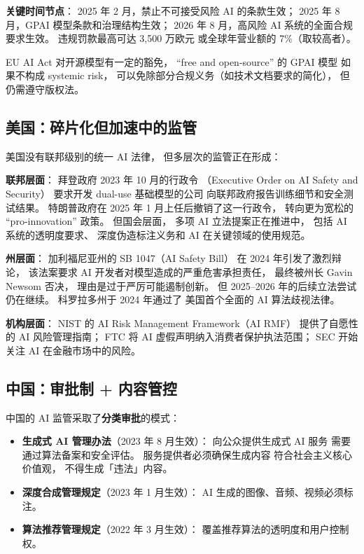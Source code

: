 \textbf{关键时间节点}：
2025 年 2 月，禁止不可接受风险 AI 的条款生效；
2025 年 8 月，GPAI 模型条款和治理结构生效；
2026 年 8 月，高风险 AI 系统的全面合规要求生效。
违规罚款最高可达 3,500 万欧元
或全球年营业额的 7\%（取较高者）。

EU AI Act 对开源模型有一定的豁免，
“free and open-source” 的 GPAI 模型
如果不构成 systemic risk，
可以免除部分合规义务（如技术文档要求的简化），
但仍需遵守版权法。

\subsection{美国：碎片化但加速中的监管}

美国没有联邦级别的统一 AI 法律，
但多层次的监管正在形成：

\textbf{联邦层面}：
拜登政府 2023 年 10 月的行政令
（Executive Order on AI Safety and Security）
要求开发 dual-use 基础模型的公司
向联邦政府报告训练细节和安全测试结果。
特朗普政府在 2025 年 1 月上任后撤销了这一行政令，
转向更为宽松的 “pro-innovation” 政策。
但国会层面，
多项 AI 立法提案正在推进中，
包括 AI 系统的透明度要求、
深度伪造标注义务和 AI 在关键领域的使用规范。

\textbf{州层面}：
加利福尼亚州的 SB 1047（AI Safety Bill）
在 2024 年引发了激烈辩论，
该法案要求 AI 开发者对模型造成的严重危害承担责任，
最终被州长 Gavin Newsom 否决，
理由是过于严厉可能遏制创新。
但 2025--2026 年的后续立法尝试仍在继续。
科罗拉多州于 2024 年通过了
美国首个全面的 AI 算法歧视法律。

\textbf{机构层面}：
NIST 的 AI Risk Management Framework（AI RMF）
提供了自愿性的 AI 风险管理指南；
FTC 将 AI 虚假声明纳入消费者保护执法范围；
SEC 开始关注 AI 在金融市场中的风险。

\subsection{中国：审批制 + 内容管控}

中国的 AI 监管采取了\textbf{分类审批}的模式：

\begin{itemize}[noitemsep]
  \item \textbf{生成式 AI 管理办法}（2023 年 8 月生效）：
        向公众提供生成式 AI 服务
        需要通过算法备案和安全评估。
        服务提供者必须确保生成内容
        符合社会主义核心价值观，
        不得生成「违法」内容。
  \item \textbf{深度合成管理规定}（2023 年 1 月生效）：
        AI 生成的图像、音频、视频必须标注。
  \item \textbf{算法推荐管理规定}（2022 年 3 月生效）：
        覆盖推荐算法的透明度和用户控制权。
\end{itemize}

